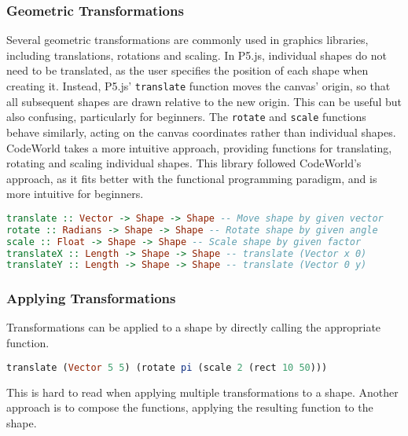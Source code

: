 \documentclass[../main.tex]{subfiles}
\begin{document}
            \subsubsection{Geometric Transformations}
                Several geometric transformations are commonly used in graphics libraries,
                    including translations, rotations and scaling.
                In P5.js, individual shapes do not need to be translated, as the user specifies
                    the position of each shape when creating it.
                Instead, P5.js' \texttt{translate} function moves the canvas' origin, so that
                    all subsequent shapes are drawn relative to the new origin.
                This can be useful but also confusing, particularly for beginners.
                The \texttt{rotate} and \texttt{scale} functions behave similarly, acting on
                    the canvas coordinates rather than individual shapes.
                CodeWorld takes a more intuitive approach, providing functions for translating,
                    rotating and scaling individual shapes.
                This library followed CodeWorld's approach, as it fits better with the
                    functional programming paradigm, and is more intuitive for beginners.

                \begin{lstlisting}[language={Haskell}, label={lst:geometric}, caption={The geometric 
                    transformation functions.}]
translate :: Vector -> Shape -> Shape -- Move shape by given vector
rotate :: Radians -> Shape -> Shape -- Rotate shape by given angle
scale :: Float -> Shape -> Shape -- Scale shape by given factor
translateX :: Length -> Shape -> Shape -- translate (Vector x 0)
translateY :: Length -> Shape -> Shape -- translate (Vector 0 y)\end{lstlisting}

            \subsubsection{Applying Transformations}
                Transformations can be applied to a shape by directly calling the appropriate
                    function.

                \begin{lstlisting}[language={Haskell}]
translate (Vector 5 5) (rotate pi (scale 2 (rect 10 50)))\end{lstlisting}

                This is hard to read when applying multiple transformations to a shape.
                Another approach is to compose the functions, applying the resulting function
                    to the shape.
\end{document}
